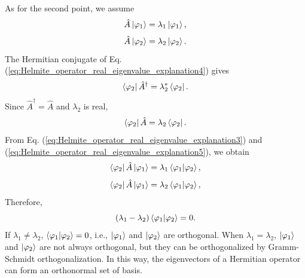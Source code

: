 \documentclass{book}
\begin{document}
As for the second point, we assume 
\begin{equation}
  \hat A \ket {\varphi_1} = \lambda_1\ket {\varphi_1},
  \label{eq:Helmite_operator_real_eigenvalue_explanation3}
\end{equation}
\begin{equation}
  \hat A \ket {\varphi_2} = \lambda_2\ket {\varphi_2}.
    \label{eq:Helmite_operator_real_eigenvalue_explanation4}
\end{equation}
The Hermitian conjugate of Eq. (\ref{eq:Helmite_operator_real_eigenvalue_explanation4})
gives
\begin{equation}
  \bra{\varphi_2}\hat A^\dagger = \lambda_2^*\bra{\varphi_2}.
\end{equation}
Since $\hat A^\dagger = \hat A$ and $\lambda_2$ is real,
\begin{equation}
  \bra{\varphi_2}\hat A = \lambda_2\bra{\varphi_2}.
    \label{eq:Helmite_operator_real_eigenvalue_explanation5}
\end{equation}
From Eq. (\ref{eq:Helmite_operator_real_eigenvalue_explanation3}) and (\ref{eq:Helmite_operator_real_eigenvalue_explanation5}), we obtain
\begin{equation}
  \bra{\varphi_2}\hat A\ket{\varphi_1} = \lambda_1\braket{\varphi_1|\varphi_2},
\end{equation}
\begin{equation}
  \bra{\varphi_2}\hat A\ket{\varphi_1} = \lambda_2\braket{\varphi_1|\varphi_2},
\end{equation}
Therefore,
\begin{equation}
(\lambda_1 - \lambda_2)\braket{\varphi_1|\varphi_2} = 0.
\end{equation}
If $\lambda_1 \neq \lambda_2$, $\braket{\varphi_1|\varphi_2}=0$, i.e., $\ket {\varphi_1}$ and $\ket{\varphi_2}$ are orthogonal. When $\lambda_1=\lambda_2$, $\ket {\varphi_1}$ and $\ket{\varphi_2}$ are not always orthogonal, but they can be orthogonalized by Gramm-Schmidt orthogonalization. In this way, the eigenvectors of a Hermitian operator can form an orthonormal set of basis.
\end{document}
